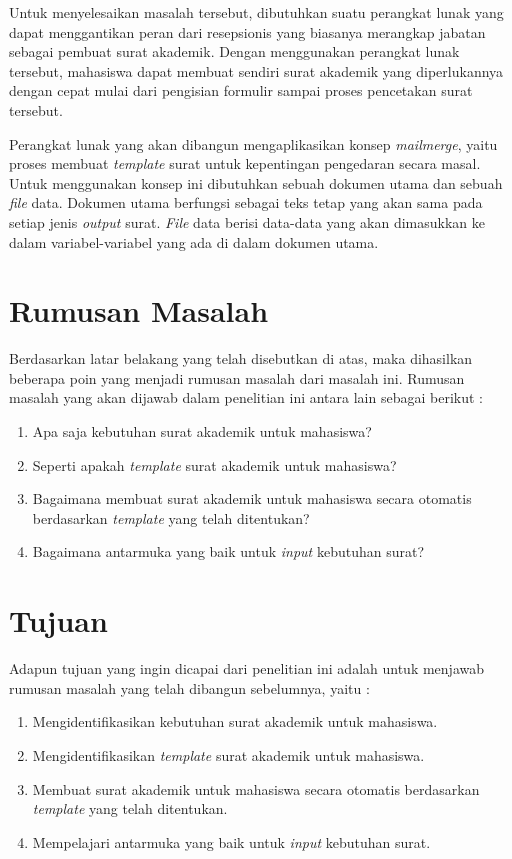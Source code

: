 Untuk menyelesaikan masalah tersebut, dibutuhkan suatu perangkat lunak yang dapat menggantikan peran dari resepsionis yang biasanya merangkap jabatan sebagai pembuat surat akademik. Dengan menggunakan perangkat lunak tersebut, mahasiswa dapat membuat sendiri surat akademik yang diperlukannya dengan cepat mulai dari pengisian formulir sampai proses pencetakan surat tersebut. \

Perangkat lunak yang akan dibangun mengaplikasikan konsep \textit{mailmerge}, yaitu proses membuat \textit{template} surat untuk kepentingan pengedaran secara masal. Untuk menggunakan konsep ini dibutuhkan sebuah dokumen utama dan sebuah \textit{file} data. Dokumen utama berfungsi sebagai teks tetap yang akan sama pada setiap jenis \textit{output} surat. \textit{File} data berisi data-data yang akan dimasukkan ke dalam variabel-variabel yang ada di dalam dokumen utama.\

\section{Rumusan Masalah}
\label{sec:rumusan_masalah}
Berdasarkan latar belakang yang telah disebutkan di atas, maka dihasilkan beberapa poin yang menjadi rumusan masalah dari masalah ini. Rumusan masalah yang akan dijawab dalam penelitian ini antara lain sebagai berikut : 
\begin{enumerate}
	\item Apa saja kebutuhan surat akademik untuk mahasiswa?
	\item Seperti apakah \textit{template} surat akademik untuk mahasiswa?
	\item Bagaimana membuat surat akademik untuk mahasiswa secara otomatis berdasarkan \textit{template} yang telah ditentukan?
	\item Bagaimana antarmuka yang baik untuk \textit{input} kebutuhan surat?
\end{enumerate}

\section{Tujuan}
\label{sec:tujuan}
Adapun tujuan yang ingin dicapai dari penelitian ini adalah untuk menjawab rumusan masalah yang telah dibangun sebelumnya, yaitu : 
\begin{enumerate}
	\item Mengidentifikasikan kebutuhan surat akademik untuk mahasiswa.
	\item Mengidentifikasikan \textit{template} surat akademik untuk mahasiswa.
	\item Membuat surat akademik untuk mahasiswa secara otomatis berdasarkan \textit{template} yang telah ditentukan.
	\item Mempelajari antarmuka yang baik untuk \textit{input} kebutuhan surat.
\end{enumerate}

